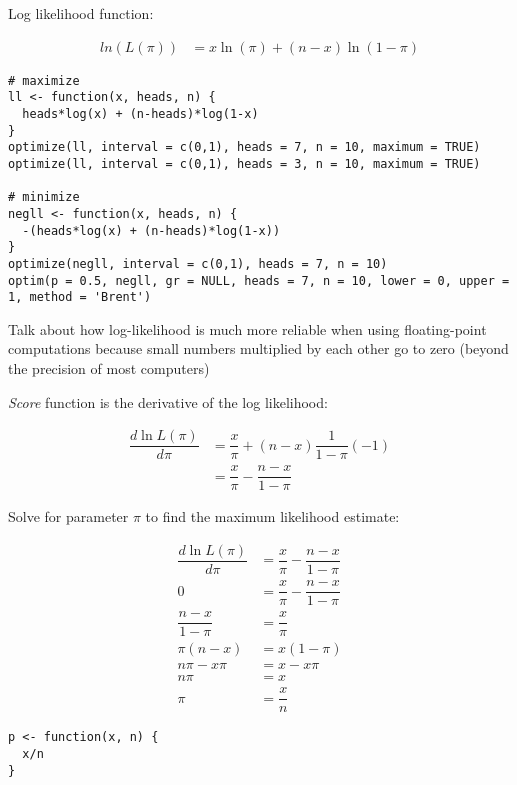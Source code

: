 \documentclass[a4paper,12pt]{article}
\begin{document}
Log likelihood function:

\begin{align*}
ln(L(\pi)) & = x \ln(\pi) + (n-x) \ln(1-\pi)
\end{align*}

\begin{lstlisting}
# maximize
ll <- function(x, heads, n) {
  heads*log(x) + (n-heads)*log(1-x)
}
optimize(ll, interval = c(0,1), heads = 7, n = 10, maximum = TRUE)
optimize(ll, interval = c(0,1), heads = 3, n = 10, maximum = TRUE)

# minimize
negll <- function(x, heads, n) {
  -(heads*log(x) + (n-heads)*log(1-x))
}
optimize(negll, interval = c(0,1), heads = 7, n = 10)
optim(p = 0.5, negll, gr = NULL, heads = 7, n = 10, lower = 0, upper = 1, method = 'Brent')
\end{lstlisting}


Talk about how log-likelihood is much more reliable when using floating-point computations because small numbers multiplied by each other go to zero (beyond the precision of most computers)







\textit{Score} function is the derivative of the log likelihood:

\begin{align*}
\dfrac{d\ln L(\pi)}{d\pi} & = \dfrac{x}{\pi} + (n-x) \dfrac{1}{1-\pi}(-1)\\
& = \dfrac{x}{\pi} - \dfrac{n-x}{1-\pi}
\end{align*}

Solve for parameter $\pi$ to find the maximum likelihood estimate:

\begin{align*}
\dfrac{d\ln L(\pi)}{d\pi} & = \dfrac{x}{\pi} - \dfrac{n-x}{1-\pi}\\
0 & = \dfrac{x}{\pi} - \dfrac{n-x}{1-\pi}\\
\dfrac{n-x}{1-\pi} & = \dfrac{x}{\pi}\\
\pi(n-x) & = x(1-\pi)\\
n\pi - x\pi & = x - x\pi\\
n\pi & = x\\
\pi & = \dfrac{x}{n}
\end{align*}



\begin{lstlisting}
p <- function(x, n) {
  x/n
}

\end{lstlisting}






\end{document}
